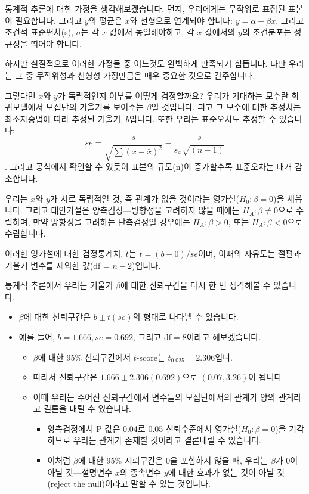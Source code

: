 \documentclass[]{book}
\providecommand{\tightlist}{%
  \setlength{\itemsep}{0pt}\setlength{\parskip}{0pt}}
\begin{document}
통계적 추론에 대한 가정을 생각해보겠습니다. 먼저, 우리에게는 무작위로 표집된 표본이 필요합니다. 그리고 \(y\)의 평균은 \(x\)와 선형으로 연계되야 합니다: \(y = \alpha + \beta x\). 그리고 조건적 표준편차(s), \(\sigma\)는 각 \(x\) 값에서 동일해야하고, 각 \(x\) 값에서의 \(y\)의 조건분포는 정규성을 띄어야 합니다.

하지만 실질적으로 이러한 가정들 중 어느것도 완벽하게 만족되기 힘듭니다. 다만 우리는 그 중 무작위성과 선형성 가정만큼은 매우 중요한 것으로 간주합니다.

그렇다면 \(x\)와 \(y\)가 독립적인지 여부를 어떻게 검정할까요? 우리가 기대하는 모수란 회귀모델에서 모집단의 기울기를 보여주는 \(\beta\)일 것입니다. 긔고 그 모수에 대한 추정치는 최소자승법에 따라 추정된 기울기, \(b\)입니다. 또한 우리는 표준오차도 추정할 수 있습니다: \[se = \frac{s}{\sqrt{\sum(x-\bar{x})^2}} - \frac{s}{s_x\sqrt{(n-1)}}\]. 그리고 공식에서 확인할 수 있듯이 표본의 규모(n)이 증가할수록 표준오차는 대개 감소합니다.

우리는 \(x\)와 \(y\)가 서로 독립적일 것, 즉 관계가 없을 것이라는 영가설(\(H_0: \beta = 0\))을 세웁니다. 그리고 대안가설은 양측검정---방향성을 고려하지 않을 때에는 \(H_A:\beta \neq 0\)으로 수립하며, 만약 방향성을 고려하는 단측검정일 경우에는 \(H_A: \beta > 0\), 또는 \(H_A: \beta < 0\)으로 수립합니다.

이러한 영가설에 대한 검정통계치, \(t\)는 \(t = (b-0)/se\)이며, 이때의 자유도는 절편과 기울기 변수를 제외한 값(df = \(n-2\))입니다.

통계적 추론에서 우리는 기울기 \(\beta\)에 대한 신뢰구간을 다시 한 번 생각해볼 수 있습니다.

\begin{itemize}
\tightlist
\item
  \(\beta\)에 대한 신뢰구간은 \(b \pm t(se)\)의 형태로 나타낼 수 있습니다.
\item
  예를 들어, \(b = 1.666, se = 0.692\), 그리고 df\(=8\)이라고 해보겠습니다.

  \begin{itemize}
  \tightlist
  \item
    \(\beta\)에 대한 95\% 신뢰구간에서 \(t\)-score는 \(t_{0.025} = 2.306\)입니.
  \item
    따라서 신뢰구간은 \(1.666\pm2.306(0.692)\)으로 \((0.07, 3.26)\)이 됩니다.
  \item
    이때 우리는 주어진 신뢰구간에서 변수들의 모집단에서의 관계가 양의 관계라고 결론을 내릴 수 있습니다.

    \begin{itemize}
    \tightlist
    \item
      양측검정에서 P-값은 0.04로 0.05 신뢰수준에서 영가설(\(H_0: \beta = 0\))을 기각하므로 우리는 관계가 존재할 것이라고 결론내릴 수 있습니다.
    \item
      이처럼 \(\beta\)에 대한 95\% 시뢰구간은 0을 포함하지 않을 때, 우리는 \(\beta\)가 0이 아닐 것---설명변수 \(x\)의 종속변수 \(y\)에 대한 효과가 없는 것이 아닐 것(reject the null)이라고 말할 수 있는 것입니다.
    \end{itemize}
  \end{itemize}
\end{itemize}
\end{document}
